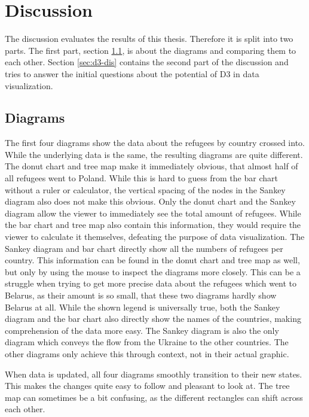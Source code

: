 \chapter{Discussion}\label{sec:discussion}
The discussion evaluates the results of this thesis. Therefore it is split into two parts. The first part, section \ref{sec:diagrams-dis}, is about the diagrams and comparing them to each other. Section \ref{sec:d3-dis} contains the second part of the discussion and tries to answer the initial questions about the potential of D3 in data visualization.

\section{Diagrams}\label{sec:diagrams-dis}
The first four diagrams show the data about the refugees by country crossed into. While the underlying data is the same, the resulting diagrams are quite different. 
The donut chart and tree map make it immediately obvious, that almost half of all refugees went to Poland. While this is hard to guess from the bar chart without a ruler or calculator, the vertical spacing of the nodes in the Sankey diagram also does not make this obvious.
Only the donut chart and the Sankey diagram allow the viewer to immediately see the total amount of refugees. While the bar chart and tree map also contain this information, they would require the viewer to calculate it themselves, defeating the purpose of data visualization.
The Sankey diagram and bar chart directly show all the numbers of refugees per country. This information can be found in the donut chart and tree map as well, but only by using the mouse to inspect the diagrams more closely. This can be a struggle when trying to get more precise data about the refugees which went to Belarus, as their amount is so small, that these two diagrams hardly show Belarus at all.
While the shown legend is universally true, both the Sankey diagram and the bar chart also directly show the names of the countries, making comprehension of the data more easy.
The Sankey diagram is also the only diagram which conveys the flow from the Ukraine to the other countries. The other diagrams only achieve this through context, not in their actual graphic.

When data is updated, all four diagrams smoothly transition to their new states. This makes the changes quite easy to follow and pleasant to look at. The tree map can sometimes be a bit confusing, as the different rectangles can shift across each other.

